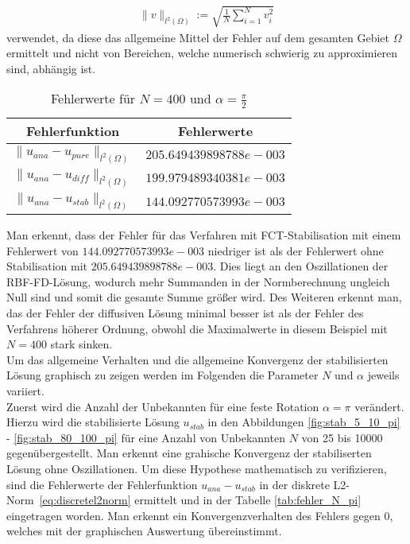 \documentclass[12pt,titlepage]{article}
\begin{document}
\begin{align}
 \|v\|_{l^2(\Omega)}:=\sqrt{\frac{1}{N}\sum\limits_{i=1}^Nv_i^2}\label{eq:discretel2norm}
\end{align}
verwendet, da diese das allgemeine Mittel der Fehler auf dem gesamten Gebiet $\Omega$ ermittelt und nicht von Bereichen, welche numerisch schwierig zu approximieren sind, abhängig ist.
\begin{table}[H]
\centering
\begin{tabular}[\textwidth]{|c|c|}
\hline
 Fehlerfunktion & Fehlerwerte\\
\hline
$\|u_{ana}-u_{pure}\|_{l^2(\Omega)}$ & $205.649439898788e-003$\\
$\|u_{ana}-u_{diff}\|_{l^2(\Omega)}$ & $199.979489340381e-003$\\
$\|u_{ana}-u_{stab}\|_{l^2(\Omega)}$ & $144.092770573993e-003$\\
\hline
\end{tabular}
\caption{Fehlerwerte für $N=400$ und $\alpha=\frac{\pi}{2}$}
\label{tab:fehler_20_pi/2}
\end{table}
\noindent
Man erkennt, dass der Fehler für das Verfahren mit FCT-Stabilisation mit einem Fehlerwert von $144.092770573993e-003$ niedriger ist als der Fehlerwert ohne Stabilisation mit $205.649439898788e-003$. Dies liegt an den Oszillationen der RBF-FD-Lösung, wodurch mehr Summanden in der Normberechnung ungleich Null sind und somit die gesamte Summe größer wird. Des Weiteren erkennt man, das der Fehler der diffusiven Lösung minimal besser ist als der Fehler des Verfahrens höherer Ordnung, obwohl die Maximalwerte in diesem Beispiel mit $N=400$ stark sinken.\\
Um das allgemeine Verhalten und die allgemeine Konvergenz der stabilisierten Lösung graphisch zu zeigen werden im Folgenden die Parameter $N$ und $\alpha$ jeweils variiert.\\
Zuerst wird die Anzahl der Unbekannten für eine feste Rotation $\alpha=\pi$ verändert. Hierzu wird die stabilisierte Lösung $u_{stab}$ in den Abbildungen \ref{fig:stab_5_10_pi} - \ref{fig:stab_80_100_pi} für eine Anzahl von Unbekannten $N$ von 25 bis 10000 gegenübergestellt. Man erkennt eine grahische Konvergenz der stabiliserten Lösung ohne Oszillationen. Um diese Hypothese mathematisch zu verifizieren, sind die Fehlerwerte der Fehlerfunktion $u_{ana}-u_{stab}$ in der diskrete L2-Norm~\eqref{eq:discretel2norm} ermittelt und in der Tabelle \ref{tab:fehler_N_pi}  eingetragen worden. Man erkennt ein Konvergenzverhalten des Fehlers gegen 0, welches mit der graphischen Auswertung übereinstimmt.
\end{document}
